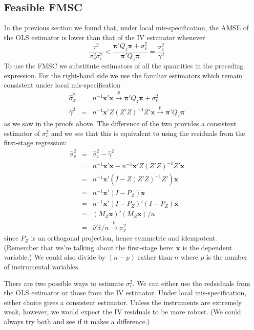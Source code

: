 \documentclass[12pt]{article}
\theoremstyle{definition}
\begin{document}
\subsection{Feasible FMSC} %
\label{sub:feasible_fmsc}
In the previous section we found that, under local mis-specification, the AMSE of the OLS estimator is lower than that of the IV estimator whenever 
    $$\frac{\tau^2}{\sigma_v^2 \sigma_\epsilon^2}  < \frac{\boldsymbol{\pi}'Q_z \boldsymbol{\pi} + \sigma_v^2}{\boldsymbol{\pi}'Q_z \boldsymbol{\pi}} = \frac{\sigma_x^2}{\gamma^2} $$
To use the FMSC we substitute estimators of all the quantities in the preceding expression. For the right-hand side we use the familiar estimators which remain consistent under local mis-specification
  \begin{eqnarray*}
     \widehat{\sigma}_x^2 &=& n^{-1}\mathbf{x}' \mathbf{x} \overset{p}{\rightarrow} \boldsymbol{\pi}'Q_z \boldsymbol{\pi} + \sigma_v^2\\
      \widehat{\gamma}^2 &=& n^{-1}\mathbf{x}' Z (Z'Z)^{-1}Z' \mathbf{x} \overset{p}{\rightarrow} \boldsymbol{\pi}'Q_z \boldsymbol{\pi} 
  \end{eqnarray*}
as we saw in the proofs above. The difference of the two provides a consistent estimator of $\sigma_v^2$ and we see that this is equivalent to using the residuals from the first-stage regression:
  \begin{eqnarray*}
     \widehat{\sigma}_v^2 &=& \widehat{\sigma}_x^2 - \widehat{\gamma}^2 \\
     &=&n^{-1}\mathbf{x}' \mathbf{x}  - n^{-1}\mathbf{x}' Z (Z'Z)^{-1}Z' \mathbf{x}\\
      &=& n^{-1} \mathbf{x}' \left(I - Z(Z'Z)^{-1}Z' \right)\mathbf{x}\\
    &=& n^{-1} \mathbf{x}' (I - P_Z)\mathbf{x}\\
    &=& n^{-1} \mathbf{x}' (I-P_Z)'(I - P_Z)\mathbf{x}\\
    &=& (M_Z \mathbf{x})'(M_Z \mathbf{x})/n\\
    &=& \widehat{v}'\widehat{v}/n \overset{p}{\rightarrow} \sigma_v^2
 \end{eqnarray*}
 since $P_Z$ is an orthogonal projection, hence symmetric and idempotent. (Remember that we're talking about the first-stage here: $\mathbf{x}$ is the dependent variable.) We could also divide by $(n - p)$ rather than $n$ where $p$ is the number of instrumental variables. 

 There are two possible ways to estimate $\sigma_\epsilon^2$. We can either use the redsiduals from the OLS estimator or those from the IV estimator. Under local mis-specification, either choice gives a consistent estimator. Unless the instruments are extremely weak, however, we would expect the IV residuals to be more robust. (We could always try both and see if it makes a difference.)  
\end{document}
